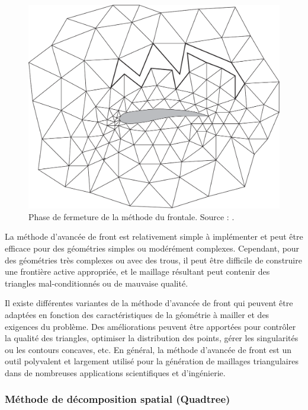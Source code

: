 \begin{figure}[!h]
    \centering
    \includegraphics[scale=0.35]{images/moving front method.png}
    \caption{Phase de fermeture de la méthode du frontale. Source : \cite{baker2005mesh}.}
    \label{fig:moving_front_method}
\end{figure}


La méthode d'avancée de front est relativement simple à implémenter et peut être efficace pour des géométries simples ou modérément complexes. Cependant, pour des géométries très complexes ou avec des trous, il peut être difficile de construire une frontière active appropriée, et le maillage résultant peut contenir des triangles mal-conditionnés ou de mauvaise qualité.

Il existe différentes variantes de la méthode d'avancée de front qui peuvent être adaptées en fonction des caractéristiques de la géométrie à mailler et des exigences du problème. Des améliorations peuvent être apportées pour contrôler la qualité des triangles, optimiser la distribution des points, gérer les singularités ou les contours concaves, etc. En général, la méthode d'avancée de front est un outil polyvalent et largement utilisé pour la génération de maillages triangulaires dans de nombreuses applications scientifiques et d'ingénierie.

\subsubsection{Méthode de décomposition spatial (Quadtree)}

